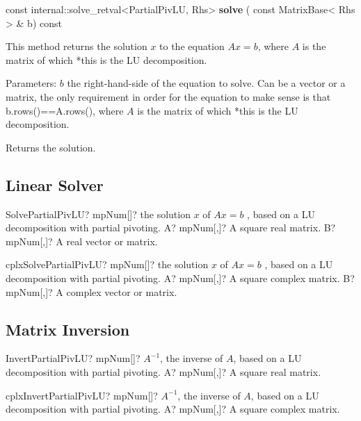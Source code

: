 \vspace{0.3cm}
const internal::solve\_retval<PartialPivLU, Rhs> \textbf{solve}  ( const MatrixBase< Rhs > \&  b)  const 

This method returns the solution $x$ to the equation $Ax=b$, where $A$ is the matrix of which *this is the LU decomposition.

Parameters: $b$ the right-hand-side of the equation to solve. Can be a vector or a matrix, the only requirement in order for the equation to make sense is that b.rows()==A.rows(), where $A$ is the matrix of which *this is the LU decomposition. 

Returns the solution.





\subsection{Linear Solver}

\begin{mpFunctionsExtract}
	\mpFunctionTwo
	{SolvePartialPivLU? mpNum[]? the solution $x$ of $A x = b$ , based on a LU decomposition with partial pivoting.}
	{A? mpNum[,]? A square real matrix.}
	{B? mpNum[,]? A real vector or matrix.}
\end{mpFunctionsExtract}


\vspace{0.6cm}
\begin{mpFunctionsExtract}
	\mpFunctionTwo
	{cplxSolvePartialPivLU? mpNum[]? the solution $x$ of $A x = b$ , based on a LU decomposition with partial pivoting.}
	{A? mpNum[,]? A square complex matrix.}
	{B? mpNum[,]? A complex vector or matrix.}
\end{mpFunctionsExtract}





\subsection{Matrix Inversion}

\begin{mpFunctionsExtract}
	\mpFunctionOne
	{InvertPartialPivLU? mpNum[]? $A^{-1}$, the inverse of $A$, based on a LU decomposition with partial pivoting.}
	{A? mpNum[,]? A square real matrix.}
\end{mpFunctionsExtract}

\vspace{0.6cm}
\begin{mpFunctionsExtract}
	\mpFunctionOne
	{cplxInvertPartialPivLU? mpNum[]? $A^{-1}$, the inverse of $A$, based on a LU decomposition with partial pivoting.}
	{A? mpNum[,]? A square complex matrix.}
\end{mpFunctionsExtract}




